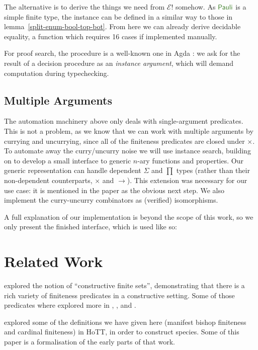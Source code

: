 The alternative is to derive the things we need from \(\mathcal{E}!\) somehow.
As \(\AgdaDatatype{Pauli}\) is a simple finite type, the instance can be defined
in a similar way to those in lemma~\ref{split-enum-bool-top-bot}.
From here we can already derive decidable equality, a function which requires 16
cases if implemented manually.

For proof search, the procedure is a well-known one in Agda
\cite{devrieseBrightSideType2011}: we ask for the result of a decision procedure
as an \emph{instance argument}, which will demand computation during
typechecking.
\subsection{Multiple Arguments}
The automation machinery above only deals with single-argument predicates.
This is not a problem, as we know that we can work with multiple arguments by
currying and uncurrying, since all of the finiteness predicates are closed under
\(\times\).
To automate away the curry/uncurry noise we will use instance search, building
on \cite{allaisGenericLevelPolymorphic2019} to develop a small interface to
generic \(n\)-ary functions and properties.
Our generic representation can handle dependent \(\Sigma\) and \(\prod\)
types (rather than their non-dependent counterparts, \(\times\) and
\(\rightarrow\)).
This extension was necessary for our use case: it is mentioned in the paper
as the obvious next step. 
We also implement the curry-uncurry combinators as (verified) isomorphisms.

A full explanation of our implementation is beyond the scope of this work, so we
only present the finished interface, which is used like so:

\section{Related Work}
\cite{spiwackConstructivelyFinite2010} explored the notion of ``constructive
finite sets'', demonstrating that there is a rich variety of finiteness
predicates in a constructive setting.
Some of those predicates where explored more in
\cite{firsovVariationsNoetherianness2016a},
\cite{parmannInvestigatingStreamlessSets2015}, and
\cite{uustaluFinitenessRationalSequences2017a}.

\cite{yorgeyCombinatorialSpeciesLabelled2014} explored some of the definitions
we have given here (manifest bishop finiteness and cardinal finiteness) in HoTT,
in order to construct species.
Some of this paper is a formalisation of the early parts of that work.

